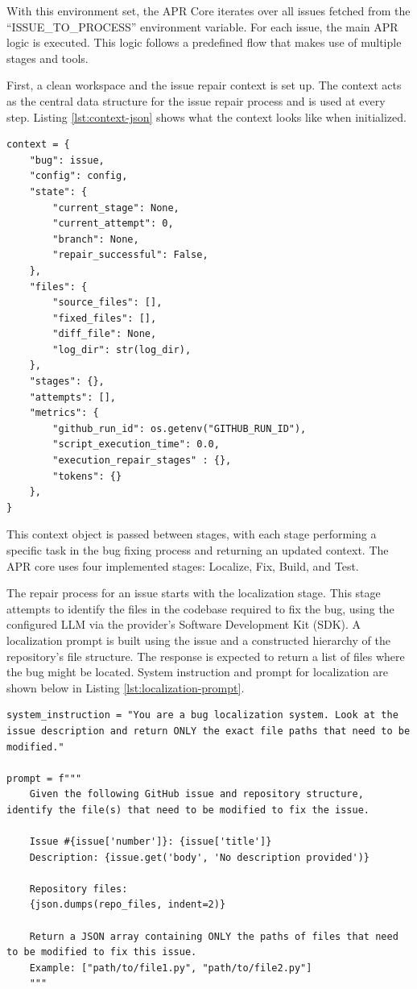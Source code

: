 With this environment set, the APR Core iterates over all issues fetched from the ``ISSUE\_TO\_PROCESS'' environment variable. For each issue, the main APR logic is executed. This logic follows a predefined flow that makes use of multiple stages and tools.

First, a clean workspace and the issue repair context is set up. The context acts as the central data structure for the issue repair process and is used at every step. Listing \ref{lst:context-json} shows what the context looks like when initialized.

\begin{lstlisting}[style=json, caption={Context JSON}, label={lst:context-json}]  
context = {
    "bug": issue,
    "config": config,
    "state": {
        "current_stage": None,
        "current_attempt": 0,
        "branch": None,
        "repair_successful": False,
    },
    "files": {
        "source_files": [],
        "fixed_files": [],
        "diff_file": None,
        "log_dir": str(log_dir),
    },
    "stages": {},
    "attempts": [],
    "metrics": {
        "github_run_id": os.getenv("GITHUB_RUN_ID"),
        "script_execution_time": 0.0,
        "execution_repair_stages" : {},
        "tokens": {}
    },
}
\end{lstlisting}

This context object is passed between stages, with each stage performing a specific task in the bug fixing process and returning an updated context. The APR core uses four implemented stages: Localize, Fix, Build, and Test.

The repair process for an issue starts with the localization stage. This stage attempts to identify the files in the codebase required to fix the bug, using the configured \ac{LLM} via the provider's Software Development Kit (SDK). A localization prompt is built using the issue and a constructed hierarchy of the repository's file structure. The response is expected to return a list of files where the bug might be located. System instruction and prompt for localization are shown below in Listing \ref{lst:localization-prompt}.

\vspace{3.9cm}

\begin{lstlisting}[style=python, caption={Localization Prompt}, label={lst:localization-prompt}]
system_instruction = "You are a bug localization system. Look at the issue description and return ONLY the exact file paths that need to be modified."

prompt = f"""
    Given the following GitHub issue and repository structure, identify the file(s) that need to be modified to fix the issue.

    Issue #{issue['number']}: {issue['title']}
    Description: {issue.get('body', 'No description provided')}

    Repository files:
    {json.dumps(repo_files, indent=2)}

    Return a JSON array containing ONLY the paths of files that need to be modified to fix this issue.
    Example: ["path/to/file1.py", "path/to/file2.py"]
    """
\end{lstlisting}

